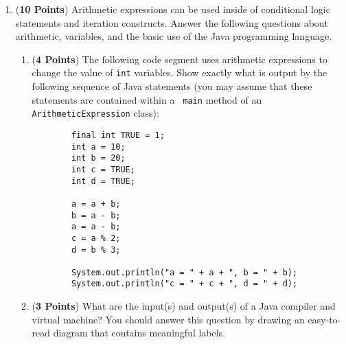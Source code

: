 \documentclass[12pt]{article}
\begin{document}
\begin{enumerate}

\item ({\bf 10 Points}) Arithmetic expressions can be used inside of
  conditional logic statements and iteration constructs.  Answer the
  following questions about arithmetic, variables, and the basic use
  of the Java programming language.

\begin{enumerate}

\item ({\bf 4 Points}) The following code segment uses arithmetic
  expressions to change the value of {\tt int} variables.  Show
  exactly what is output by the following sequence of Java statements
  (you may assume that these statements are contained within a {\tt
    main} method of an {\tt ArithmeticExpression} class):

\begin{verbatim}
        final int TRUE = 1;
        int a = 10;
        int b = 20;
        int c = TRUE;
        int d = TRUE;
        
        a = a + b;
        b = a - b;
        a = a - b;
        c = a % 2;
        d = b % 3;
        
        System.out.println("a = " + a + ", b = " + b);
        System.out.println("c = " + c + ", d = " + d);
\end{verbatim}

\item ({\bf 3 Points}) What are the input(s) and output(s) of a Java
  compiler and virtual machine?  You should answer this question by
  drawing an easy-to-read diagram that contains meaningful labels.





\end{enumerate}
\end{enumerate}
\end{document}

